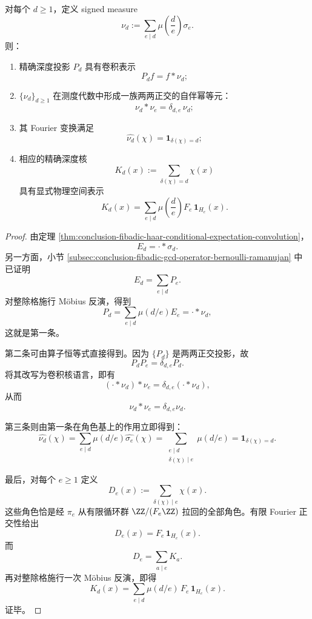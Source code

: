 \begin{theorem}\label{thm:conclusion-fibadic-signed-haar-idempotent-ramanujan-shell}
对每个 \(d\ge 1\)，定义 signed measure
\[
\nu_d:=\sum_{e\mid d}\mu\!\left(\frac{d}{e}\right)\sigma_e.
\]
则：
\begin{enumerate}
  \item 精确深度投影 \(P_d\) 具有卷积表示
  \[
  P_df=f*\nu_d;
  \]
  \item \(\{\nu_d\}_{d\ge 1}\) 在测度代数中形成一族两两正交的自伴幂等元：
  \[
  \nu_d*\nu_e=\delta_{d,e}\,\nu_d;
  \]
  \item 其 Fourier 变换满足
  \[
  \widehat{\nu_d}(\chi)=\mathbf 1_{\delta(\chi)=d};
  \]
  \item 相应的精确深度核
  \[
  K_d(x):=\sum_{\delta(\chi)=d}\chi(x)
  \]
  具有显式物理空间表示
  \[
  K_d(x)=\sum_{e\mid d}\mu\!\left(\frac{d}{e}\right)F_e\,\mathbf 1_{H_e}(x).
  \]
\end{enumerate}
\end{theorem}
\begin{proof}
由定理 \ref{thm:conclusion-fibadic-haar-conditional-expectation-convolution}，
\[
E_d=\cdot*\sigma_d.
\]
另一方面，小节 \ref{subsec:conclusion-fibadic-gcd-operator-bernoulli-ramanujan} 中已证明
\[
E_d=\sum_{e\mid d}P_e.
\]
对整除格施行 Möbius 反演，得到
\[
P_d=\sum_{e\mid d}\mu(d/e)E_e=\cdot *\nu_d,
\]
这就是第一条。

第二条可由算子恒等式直接得到。因为 \(\{P_d\}\) 是两两正交投影，故
\[
P_dP_e=\delta_{d,e}P_d.
\]
将其改写为卷积核语言，即有
\[
(\cdot *\nu_d)*\nu_e=\delta_{d,e}(\cdot *\nu_d),
\]
从而
\[
\nu_d*\nu_e=\delta_{d,e}\nu_d.
\]

第三条则由第一条在角色基上的作用立即得到：
\[
\widehat{\nu_d}(\chi)
=
\sum_{e\mid d}\mu(d/e)\widehat{\sigma_e}(\chi)
=
\sum_{\substack{e\mid d\\ \delta(\chi)\mid e}}\mu(d/e)
=
\mathbf 1_{\delta(\chi)=d}.
\]

最后，对每个 \(e\ge 1\) 定义
\[
D_e(x):=\sum_{\delta(\chi)\mid e}\chi(x).
\]
这些角色恰是经 \(\pi_e\) 从有限循环群 \(\ZZ/(F_e\ZZ)\) 拉回的全部角色。有限 Fourier 正交性给出
\[
D_e(x)=F_e\,\mathbf 1_{H_e}(x).
\]
而
\[
D_e=\sum_{a\mid e}K_a.
\]
再对整除格施行一次 Möbius 反演，即得
\[
K_d(x)=\sum_{e\mid d}\mu(d/e)\,F_e\,\mathbf 1_{H_e}(x).
\]
证毕。
\end{proof}

